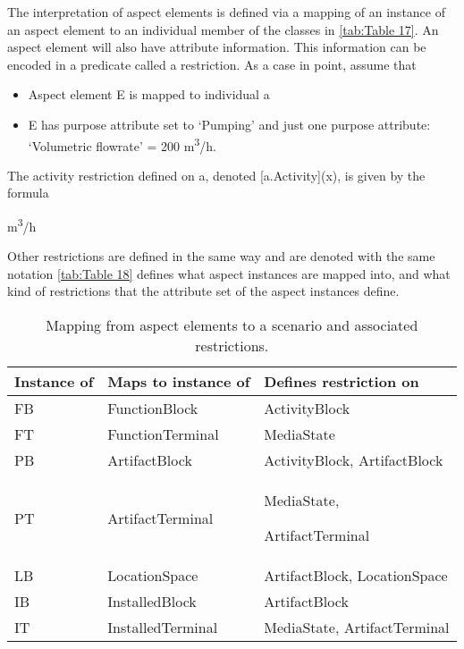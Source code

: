 The interpretation of aspect elements is defined via a mapping of an instance of an aspect element to an individual
member of the classes in \autoref{tab:Table 17}. An aspect element will also have attribute information. This information can be
encoded in a predicate called a restriction. As a case in point, assume that

\begin{itemize}
  \item Aspect element E is mapped to individual a
  \item E has purpose attribute set to `Pumping' and just one purpose attribute: `Volumetric flowrate' = 200
        m\textsuperscript{3}/h.
\end{itemize}
The activity restriction defined on a, denoted [a.Activity](x), is given by the formula

  { m\textsuperscript{3}/h}

Other restrictions are defined in the same way and are denoted with the same notation \autoref{tab:Table 18} defines what aspect
instances are mapped into, and what kind of restrictions that the attribute set of the aspect instances define.

\begin{table}[htb]\centering\caption{Mapping from aspect elements to a scenario and
    associated restrictions.}\label{tab:Table 18}
  \begin{supertabular}{|m{1.0010599in}|m{1.98786in}|m{2.97326in}|}
    \hline
    {\bfseries Instance of} &
    {\bfseries Maps to instance of} &
    {\bfseries Defines restriction on }\\\hline
    FB &
    FunctionBlock &
    ActivityBlock\\\hline
    FT &
    FunctionTerminal  &
    MediaState\\\hline
    PB &
    ArtifactBlock &
    ActivityBlock, ArtifactBlock\\\hline
    PT &
    ArtifactTerminal &
    MediaState,

    ArtifactTerminal\\\hline
    LB &
    LocationSpace &
    ArtifactBlock, LocationSpace\\\hline
    IB &
    InstalledBlock &
    ArtifactBlock\\\hline
    IT &
    InstalledTerminal &
    MediaState, ArtifactTerminal\\\hline
  \end{supertabular}
\end{table}

